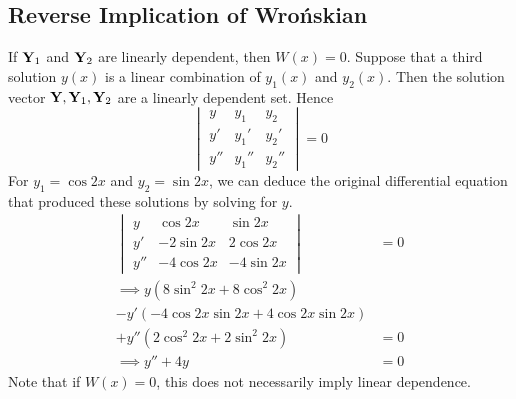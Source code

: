 \subsection{Reverse Implication of Wro\'nskian}
If \(\vb Y_1\) and \(\vb Y_2\) are linearly dependent, then \(W(x) = 0\).
Suppose that a third solution \(y(x)\) is a linear combination of \(y_1(x)\) and \(y_2(x)\).
Then the solution vector \(\vb Y, \vb Y_1, \vb Y_2\) are a linearly dependent set.
Hence
\[
	\begin{vmatrix}
		y   & y_1   & y_2   \\
		y'  & y_1'  & y_2'  \\
		y'' & y_1'' & y_2''
	\end{vmatrix}
	= 0
\]
For \(y_1 = \cos 2x\) and \(y_2 = \sin 2x\), we can deduce the original differential equation that produced these solutions by solving for \(y\).
\begin{align*}
	\begin{vmatrix}
		y   & \cos 2x   & \sin 2x    \\
		y'  & -2\sin 2x & 2 \cos 2x  \\
		y'' & -4\cos 2x & -4 \sin 2x
	\end{vmatrix}          & = 0 \\
	\implies y(8\sin^2 2x + 8\cos^2 2x) &     \\ - y'(-4 \cos 2x \sin 2x + 4 \cos 2x \sin 2x) &\\ + y''(2\cos^2 2x + 2\sin^2 2x) &= 0 \\
	\implies y'' + 4y                   & = 0
\end{align*}
Note that if \(W(x) = 0\), this does not necessarily imply linear dependence.
